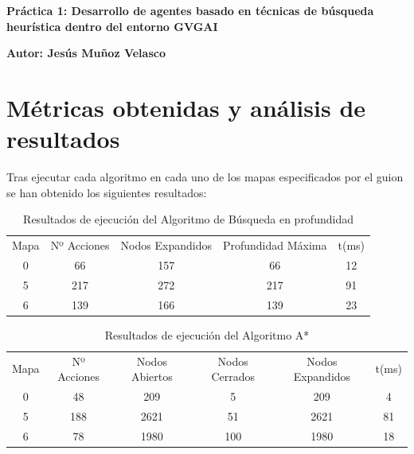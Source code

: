\documentclass[11pt]{article}
\title{}
\author{Jesús Muñoz Velasco}
\date{Curso 2025-2026}
\begin{document}
{\Large \bfseries \centering \color{maincolor} Práctica 1: Desarrollo de agentes basado en técnicas de búsqueda heurística dentro del entorno GVGAI}

\vspace{0.25cm}
{\large \bfseries \color{maincolor} Autor: Jesús Muñoz Velasco}

\section{Métricas obtenidas y análisis de resultados}
Tras ejecutar cada algoritmo en cada uno de los mapas especificados por el guion se han obtenido los siguientes resultados:

\begin{table}[H]
    \centering
    \label{tab:metricas_resultados_DFS}
    \begin{tabular}{|c | c | c | c | c |}
        \hline
        \rowcolor{Violet}
        \color{white} Mapa & \color{white} Nº Acciones & \color{white} Nodos Expandidos & \color{white} Profundidad Máxima & \color{white} t(ms)\\
        0 & 66 & 157 & 66 & 12 \\
        5 & 217 & 272 & 217 & 91 \\
        6 & 139 & 166 & 139 & 23 \\
        \hline
    \end{tabular}%
    \caption{Resultados de ejecución del Algoritmo de Búsqueda en profundidad}
\end{table}

\begin{table}[H]
    \centering
    \label{tab:metricas_resultados_Astar}
    \begin{tabular}{| c | c | c | c | c | c |}
        \hline
        \rowcolor{Violet} \color{white} Mapa & \color{white} Nº Acciones & \color{white} Nodos Abiertos & \color{white} Nodos Cerrados & \color{white} Nodos Expandidos & \color{white} t(ms)\\
        0 & 48 & 209 & 5 & 209 & 4\\
        5 & 188 & 2621 & 51 & 2621 & 81\\
        6 & 78 & 1980 & 100 & 1980 & 18\\
        \hline
    \end{tabular}%
    \caption{Resultados de ejecución del Algoritmo A*}
\end{table}
\end{document}
